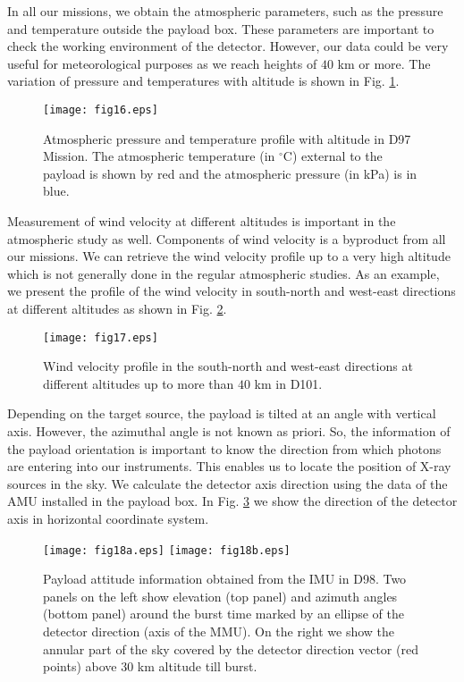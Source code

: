 In all our missions, we obtain the atmospheric parameters, such as
the pressure and temperature outside the payload box.
These parameters are important to check the working environment of
the detector. However, our data could be very useful for meteorological purposes
as we reach heights of $40$ km or more. The variation of pressure and temperatures with
altitude is shown in Fig. \ref{fig:prte}.

\begin{figure}[h]
  \centering
  \texttt{[image: fig16.eps]}
  \caption{Atmospheric pressure and temperature profile with altitude in D97 Mission.
  The atmospheric temperature (in $^{\circ}$C)
  external to the payload is shown by red and the atmospheric pressure (in kPa) is in blue.}
   \label{fig:prte}
\end{figure}

Measurement of wind velocity at different altitudes is important in 
the atmospheric study as well. Components of wind velocity is a byproduct from 
all our missions. We can retrieve the wind velocity profile up to a 
very high altitude which is not generally done in the regular atmospheric 
studies. As an example, we present the profile of the wind 
velocity in south-north and west-east directions at different
altitudes as shown in Fig. \ref{fig:wind}.

\begin{figure}[h]
  \centering
  \texttt{[image: fig17.eps]}
  \caption{Wind velocity profile in the south-north and west-east directions
  at different altitudes up to more than $40$ km in D101.}
  \label{fig:wind}
\end{figure}

Depending on the target source, the payload is tilted at an angle with vertical axis. 
However, the azimuthal angle is not known as priori. So,
the information of the payload orientation is important to know the direction from which 
photons are entering into our instruments. This enables us to locate the position 
of X-ray sources in the sky. We calculate the detector axis direction 
using the data of the AMU installed in the payload box.
In Fig. \ref{fig:att} we show the direction of the detector axis 
in horizontal coordinate system.

\begin{figure}[h]
  \centering
  \texttt{[image: fig18a.eps]}
  \texttt{[image: fig18b.eps]}
  \caption{Payload attitude information obtained from the IMU in D98.
Two panels on the left show elevation (top panel) and azimuth angles (bottom panel) around
the burst time marked by an ellipse of the detector direction (axis of the MMU). On the
right we show the annular part of the sky covered by the detector direction vector (red points) 
above 30 km altitude till burst.
}
\label{fig:att}
\end{figure}


